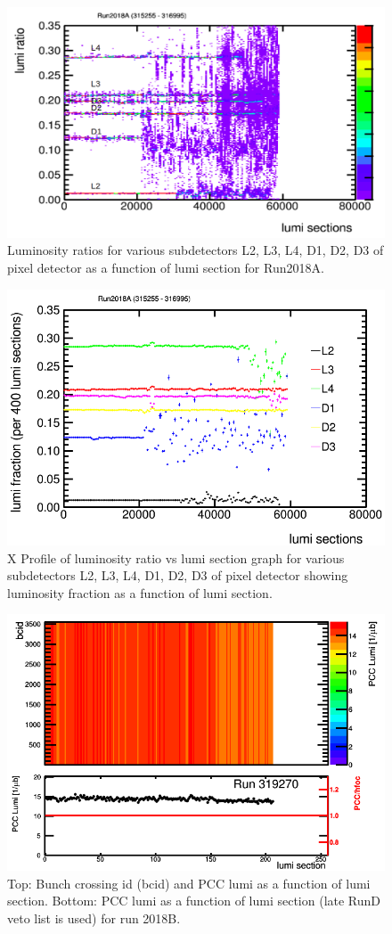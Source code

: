 \begin{figure}[H]
  \centering
  \includegraphics[width=0.52\columnwidth]{./2018A_lumiratio.png}
  \caption{Luminosity ratios for various subdetectors L2, L3, L4, D1, D2, D3 of pixel detector as a function of lumi section for Run2018A.}
  \label{fig:CMS}
\end{figure}



\begin{figure}[H]
  \centering
  \includegraphics[width=0.52\columnwidth]{./ProfileXcombined_new.png}
  \caption{X Profile of luminosity ratio vs lumi section graph for various subdetectors L2, L3, L4, D1, D2, D3 of pixel detector showing luminosity fraction as a function of lumi section.}
  \label{fig:CMS}
\end{figure}





\begin{figure}[H]
  \centering
  \includegraphics[width=0.52\columnwidth]{./319270.png}
  \caption{Top: Bunch crossing id (bcid) and PCC lumi as a function of lumi section. Bottom: PCC lumi as a function of lumi section (late RunD veto list is used) for run 2018B.}
  \label{fig:CMS}
\end{figure}


